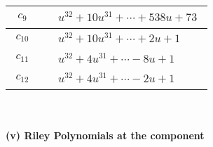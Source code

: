 \documentclass[1p]{elsarticle_modified}
\theoremstyle{definition}
\begin{document}
\begin{tabular}{m{50pt}|m{274pt}}
\hline $$\begin{aligned}c_{9}\end{aligned}$$&$\begin{aligned}
&u^{32}+10 u^{31}+\cdots+538 u+73
\end{aligned}$\\
\hline $$\begin{aligned}c_{10}\end{aligned}$$&$\begin{aligned}
&u^{32}+10 u^{31}+\cdots+2 u+1
\end{aligned}$\\
\hline $$\begin{aligned}c_{11}\end{aligned}$$&$\begin{aligned}
&u^{32}+4 u^{31}+\cdots-8 u+1
\end{aligned}$\\
\hline $$\begin{aligned}c_{12}\end{aligned}$$&$\begin{aligned}
&u^{32}+4 u^{31}+\cdots-2 u+1
\end{aligned}$\\
\hline
\end{tabular}\\~\\
\newpage\renewcommand{\arraystretch}{1}
\flushleft \textbf{(v) Riley Polynomials at the component}\newline \\
\end{document}
